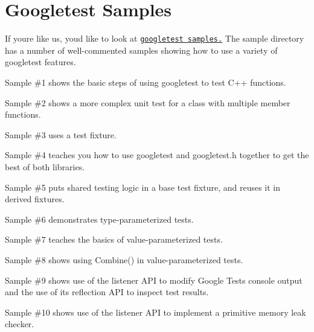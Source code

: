 \chapter{Googletest Samples }
\hypertarget{md_build_2__deps_2googletest-src_2docs_2samples}{}\label{md_build_2__deps_2googletest-src_2docs_2samples}
\label{md_build_2__deps_2googletest-src_2docs_2samples_autotoc_md373}%
%


If you\textquotesingle{}re like us, you\textquotesingle{}d like to look at \href{https://github.com/google/googletest/blob/main/googletest/samples}{\texttt{googletest samples.}} The sample directory has a number of well-\/commented samples showing how to use a variety of googletest features.


\begin{DoxyItemize}
\item Sample \#1 shows the basic steps of using googletest to test C++ functions.
\item Sample \#2 shows a more complex unit test for a class with multiple member functions.
\item Sample \#3 uses a test fixture.
\item Sample \#4 teaches you how to use googletest and {\ttfamily googletest.\+h} together to get the best of both libraries.
\item Sample \#5 puts shared testing logic in a base test fixture, and reuses it in derived fixtures.
\item Sample \#6 demonstrates type-\/parameterized tests.
\item Sample \#7 teaches the basics of value-\/parameterized tests.
\item Sample \#8 shows using {\ttfamily Combine()} in value-\/parameterized tests.
\item Sample \#9 shows use of the listener API to modify Google Test\textquotesingle{}s console output and the use of its reflection API to inspect test results.
\item Sample \#10 shows use of the listener API to implement a primitive memory leak checker. 
\end{DoxyItemize}